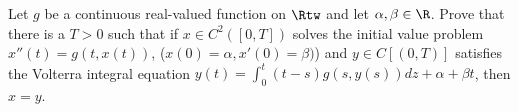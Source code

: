 Let $g$ be a continuous real-valued function on $\Rtw$ and let
$\alpha,\beta\in \R$. Prove that there is a $T>0$ such that if $x\in
C^2([0,T])$ solves the initial value problem $x''(t)=g(t,x(t))$,
($x(0)=\alpha,x'(0)=\beta)$) and $y\in C[(0,T)]$ satisfies the
Volterra integral equation
$y(t)=\int_{0}^t(t-s)g(s,y(s))dz+\alpha+\beta t$, then $x=y$.
